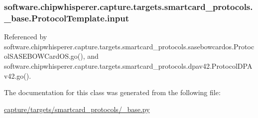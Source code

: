 \hypertarget{classsoftware_1_1chipwhisperer_1_1capture_1_1targets_1_1smartcard__protocols_1_1__base_1_1ProtocolTemplate_a5e6c7014b74f020df7cdeb09a6649b3e}{}
\subsubsection[{input}]{\setlength{\rightskip}{0pt plus 5cm}software.\+chipwhisperer.\+capture.\+targets.\+smartcard\+\_\+protocols.\+\_\+base.\+Protocol\+Template.\+input}\label{classsoftware_1_1chipwhisperer_1_1capture_1_1targets_1_1smartcard__protocols_1_1__base_1_1ProtocolTemplate_a5e6c7014b74f020df7cdeb09a6649b3e}


Referenced by software.\+chipwhisperer.\+capture.\+targets.\+smartcard\+\_\+protocols.\+sasebowcardos.\+Protocol\+S\+A\+S\+E\+B\+O\+W\+Card\+O\+S.\+go(), and software.\+chipwhisperer.\+capture.\+targets.\+smartcard\+\_\+protocols.\+dpav42.\+Protocol\+D\+P\+Av42.\+go().



The documentation for this class was generated from the following file\+:\begin{DoxyCompactItemize}
\item 
\hyperlink{capture_2targets_2smartcard__protocols_2__base_8py}{capture/targets/smartcard\+\_\+protocols/\+\_\+base.\+py}\end{DoxyCompactItemize}
